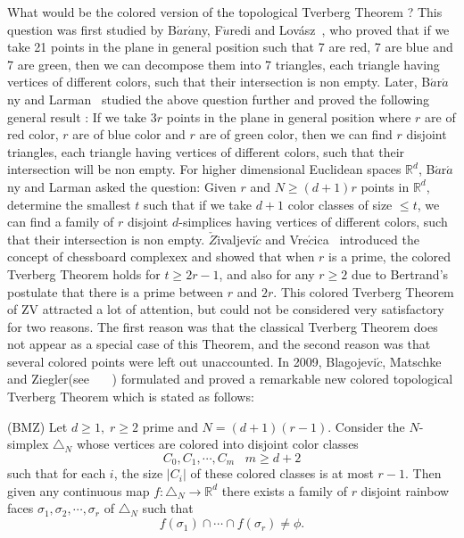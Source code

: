 \documentclass[11pt]{amsart}
\def\R{\mathbb R}
\def\t{\triangle}
\def\bn{\bigskip\noindent}
\begin{document}
\bn What would be the colored version of the topological Tverberg Theorem ?
This question was first studied by B$\acute{a}$r$\acute{a}$ny, F$\ddot{u}$redi and Lov\'{a}sz~\cite{bar-fur-lov}, who proved that if we take 21 points in the plane in general position such that 7 are red, 7 are blue and 7 are  green, then we can decompose them into 7 triangles, each triangle having vertices of different colors, such that their intersection is non empty. Later, B$\acute{a}$r$\acute{a}$ny and Larman~\cite{bar} studied the above question further and proved the following general result : If we take $3r$ points in the plane in general position where $r$ are of red color, $r$ are of blue color and  $r$ are of green color, then we can find $r$ disjoint  triangles, each triangle having vertices of different colors, such that their intersection will be non empty. For higher dimensional Euclidean spaces $\R^d$, B$\acute{a}$r$\acute{a}$ny and Larman asked the question:  Given $r$ and $N\geq (d+1)r$ points in $\R^d$, determine the smallest $t$ such that  if we take $d+1$ color classes of size $\leq t$, we can find  a family of $r$ disjoint $d$-simplices having vertices of different colors, such that their intersection is non empty.  $\check{Z}$ivaljevi$\acute{c}$ and Vre$\acute{c}$ica~\cite{vre-ziv} introduced the concept of chessboard complexex and showed that when $r$ is a prime, the colored Tverberg Theorem holds for $t\geq 2r-1$, and also for any $r\geq 2$ due to Bertrand's postulate that there is a prime between $r$ and $2r$.  This colored Tverberg Theorem of ZV attracted a lot of attention, but could not be considered very satisfactory for two reasons. The first reason was that the classical Tverberg Theorem does not appear as a special case of this Theorem, and the second reason was that several colored points were left out unaccounted. In 2009, Blagojevi$\acute{c}$, Matschke and Ziegler(see ~\cite{bmz}~\cite{bmz2}~\cite{bmz3}) formulated and proved a remarkable new colored topological Tverberg Theorem which is stated as follows:

{\Thm (BMZ)  Let $d\geq 1,\; r\geq 2$ prime and $N=(d+1)(r-1)$. Consider the $N$-simplex $\t_N$ whose vertices are colored into disjoint color classes
$$C_0,C_1,\cdots ,C_m\;\;\;m\geq d+2$$ such that for each $i$, the size $|C_i|$ of these colored classes is at most $r-1$. Then given any continuous map $f: \t_N\to\R^d$ there exists a family of $r$ disjoint rainbow faces $\sigma_1,\sigma_2, \cdots ,\sigma_r$ of $\t_N$ such that
$$f(\sigma_1)\cap\cdots\cap f(\sigma_r)\neq \phi.$$
}
\end{document}

